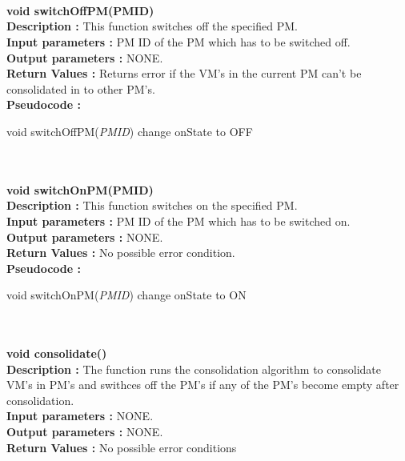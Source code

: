 \documentclass[a4paper,11pt]{article}
\begin{document}
\mbox{}\\\\
\pagebreak
\\
\textbf{ void switchOffPM(PM\textunderscore ID)}
\\
\textbf{Description :} This function switches off the specified PM.
\\
\textbf{Input parameters :} PM ID of the PM which has to be switched off.
\\
\textbf{Output parameters :} NONE.
\\
\textbf{Return Values :} Returns error if the VM's in the current PM can't be consolidated in to other PM's.
\\
\textbf{Pseudocode :}
\begin{algorithmic}[1]
\STATE void switchOffPM(\emph{PM\textunderscore ID})
\STATE change onState to OFF
\ENDIF
\ENDFOR
\end{algorithmic}
\mbox{}\\\\
\textbf{ void switchOnPM(PM\textunderscore ID)}
\\
\textbf{Description :} This function switches on the specified PM.
\\
\textbf{Input parameters :} PM ID of the PM which has to be switched on.
\\
\textbf{Output parameters :} NONE.
\\
\textbf{Return Values :} No possible error condition.
\\
\textbf{Pseudocode :}
\begin{algorithmic}[1]
\STATE void switchOnPM(\emph{PM\textunderscore ID})
\STATE change onState to ON
\ENDIF
\ENDFOR
\end{algorithmic}
\mbox{}\\\\
\textbf{ void consolidate()}
\\
\textbf{Description :} The function runs the consolidation algorithm to consolidate VM's in PM's and swithces 
off the PM's if any of the PM's become empty after consolidation.
\\
\textbf{Input parameters :} NONE.
\\
\textbf{Output parameters :} NONE.
\\
\textbf{Return Values :} No possible error conditions
\\
\end{document}
